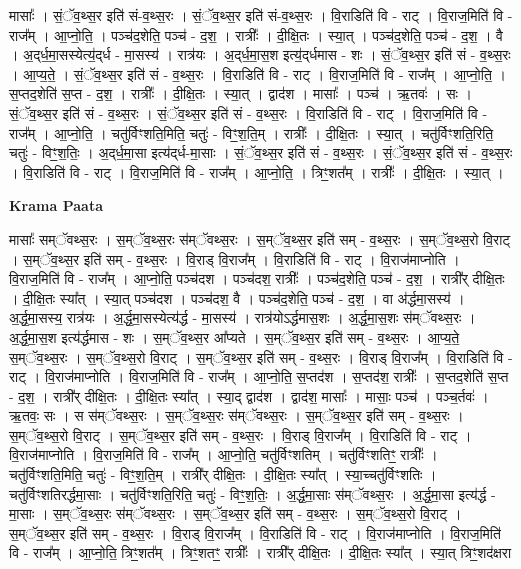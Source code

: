 \documentclass[17pt]{extarticle}
\begin{document}
मासाः᳚ । सं॒ॅव॒थ्स॒र इति॑ सं-व॒थ्स॒रः । सं॒ॅव॒थ्स॒र इति॑ सं-व॒थ्स॒रः । वि॒राडिति॑ वि -   राट् । वि॒राज॒मिति॑ वि - राज᳚म् । आ॒प्नो॒ति॒ । पञ्च॑द॒शेति॒ पञ्च॑ - द॒श॒ । रात्रीः᳚ । दी॒क्षि॒तः । स्या॒त् । पञ्च॑द॒शेति॒ पञ्च॑ - द॒श॒ । वै । अ॒द्‌र्ध॒मा॒सस्येत्य॒॑द्‌र्ध - मा॒सस्य॑ ।   रात्र॑यः । अ॒द्‌र्ध॒मा॒स॒श इत्य॒॑द्‌र्धमास -   शः । सं॒ॅव॒थ्स॒र इति॑ सं - व॒थ्स॒रः । आ॒प्य॒ते॒ । सं॒ॅव॒थ्स॒र इति॑ सं - व॒थ्स॒रः । वि॒राडिति॑ वि - राट् । वि॒राज॒मिति॑ वि - राज᳚म् । आ॒प्नो॒ति॒ । स॒प्तद॒शेति॑ स॒प्त - द॒श॒ । रात्रीः᳚ । दी॒क्षि॒तः । स्या॒त् । द्वाद॑श । मासाः᳚ । पञ्च॑ । ऋ॒तवः॑ । सः । सं॒ॅव॒थ्स॒र इति॑ सं - व॒थ्स॒रः । सं॒ॅव॒थ्स॒र इति॑ सं - व॒थ्स॒रः । वि॒राडिति॑ वि - राट् । वि॒राज॒मिति॑ वि - राज᳚म् । आ॒प्नो॒ति॒ । चतु॑र्विꣳशति॒मिति॒ चतुः॑ - विꣳ॒॒श॒ति॒म् । रात्रीः᳚ । दी॒क्षि॒तः । स्या॒त् । चतु॑र्विꣳशति॒रिति॒ चतुः॑ - विꣳ॒॒श॒तिः॒ । अ॒द्‌र्ध॒मा॒सा इत्य॑द्‌र्ध-मा॒साः । सं॒ॅव॒थ्स॒र इति॑ सं - व॒थ्स॒रः । सं॒ॅव॒थ्स॒र इति॑ सं - व॒थ्स॒रः । वि॒राडिति॑ वि - राट् । वि॒राज॒मिति॑ वि - राज᳚म् । आ॒प्नो॒ति॒ । त्रिꣳ॒॒शत᳚म् । रात्रीः᳚ । दी॒क्षि॒तः । स्या॒त् ।  \newline


\textbf{Krama Paata} \newline

मासाः᳚ सम्ॅवथ्स॒रः । स॒म्ॅव॒थ्स॒रः स॑म्ॅवथ्स॒रः । स॒म्ॅव॒थ्स॒र इति॑ सम् - व॒थ्स॒रः । स॒म्ॅव॒थ्स॒रो वि॒राट् । स॒म्ॅव॒थ्स॒र इति॑ सम् - व॒थ्स॒रः । वि॒राड् वि॒राज᳚म् । वि॒राडिति॑ वि - राट् । वि॒राज॑माप्नोति । वि॒राज॒मिति॑ वि - राज᳚म् । आ॒प्नो॒ति॒ पञ्च॑दश । पञ्च॑दश॒ रात्रीः᳚ । पञ्च॑द॒शेति॒ पञ्च॑ - द॒श॒ । रात्री᳚र् दीक्षि॒तः । दी॒क्षि॒तः स्या᳚त् । स्या॒त् पञ्च॑दश । पञ्च॑दश॒ वै । पञ्च॑द॒शेति॒ पञ्च॑ - द॒श॒ । वा अ॑र्द्धमा॒सस्य॑ । अ॒र्द्ध॒मा॒सस्य॒ रात्र॑यः । अ॒र्द्ध॒मा॒सस्येत्य॑र्द्ध - मा॒सस्य॑ । रात्र॑योऽर्द्धमास॒शः । अ॒र्द्ध॒मा॒स॒शः स॑म्ॅवथ्स॒रः । अ॒र्द्ध॒मा॒स॒श इत्य॑र्द्धमास - शः । स॒म्ॅव॒थ्स॒र आ᳚प्यते । स॒म्ॅव॒थ्स॒र इति॑ सम् - व॒थ्स॒रः । आ॒प्य॒ते॒ स॒म्ॅव॒थ्स॒रः । स॒म्ॅव॒थ्स॒रो वि॒राट् । स॒म्ॅव॒थ्स॒र इति॑ सम् - व॒थ्स॒रः । वि॒राड् वि॒राज᳚म् । वि॒राडिति॑ वि - राट् । वि॒राज॑माप्नोति । वि॒राज॒मिति॑ वि - राज᳚म् । आ॒प्नो॒ति॒ स॒प्तद॑श । स॒प्तद॑श॒ रात्रीः᳚ । स॒प्तद॒शेति॑ स॒प्त - द॒श॒ । रात्री᳚र् दीक्षि॒तः । दी॒क्षि॒तः स्या᳚त् । स्या॒द् द्वाद॑श । द्वाद॑श॒ मासाः᳚ । मासाः॒ पञ्च॑ । पञ्च॒र्तवः॑ । ऋ॒तवः॒ सः । स स॑म्ॅवथ्स॒रः । स॒म्ॅव॒थ्स॒रः स॑म्ॅवथ्स॒रः । स॒म्ॅव॒थ्स॒र इति॑ सम् - व॒थ्स॒रः । स॒म्ॅव॒थ्स॒रो वि॒राट् । स॒म्ॅव॒थ्स॒र इति॑ सम् - व॒थ्स॒रः । वि॒राड् वि॒राज᳚म् । वि॒राडिति॑ वि - राट् । वि॒राज॑माप्नोति । वि॒राज॒मिति॑ वि - राज᳚म् । आ॒प्नो॒ति॒ चतु॑र्विꣳशतिम् । चतु॑र्विꣳशतिꣳ॒॒ रात्रीः᳚ । चतु॑र्विꣳशति॒मिति॒ चतुः॑ - विꣳ॒॒श॒ति॒म् । रात्री᳚र् दीक्षि॒तः । दी॒क्षि॒तः स्या᳚त् । स्या॒च्चतु॑र्विꣳशतिः । चतु॑र्विꣳशतिरर्द्धमा॒साः । चतु॑र्विꣳशति॒रिति॒ चतुः॑ - विꣳ॒॒श॒तिः॒ । अ॒र्द्ध॒मा॒साः स॑म्ॅवथ्स॒रः । अ॒र्द्ध॒मा॒सा इत्य॑र्द्ध - मा॒साः । स॒म्ॅव॒थ्स॒रः स॑म्ॅवथ्स॒रः । स॒म्ॅव॒थ्स॒र इति॑ सम् - व॒थ्स॒रः । स॒म्ॅव॒थ्स॒रो वि॒राट् । स॒म्ॅव॒थ्स॒र इति॑ सम् - व॒थ्स॒रः । वि॒राड् वि॒राज᳚म् । वि॒राडिति॑ वि - राट् । वि॒राज॑माप्नोति । वि॒राज॒मिति॑ वि - राज᳚म् । आ॒प्नो॒ति॒ त्रिꣳ॒॒शत᳚म् । त्रिꣳ॒॒शतꣳ॒॒ रात्रीः᳚ । रात्री᳚र् दीक्षि॒तः । दी॒क्षि॒तः स्या᳚त् । स्या॒त् त्रिꣳ॒॒शद॑क्षरा \newline
\end{document}
